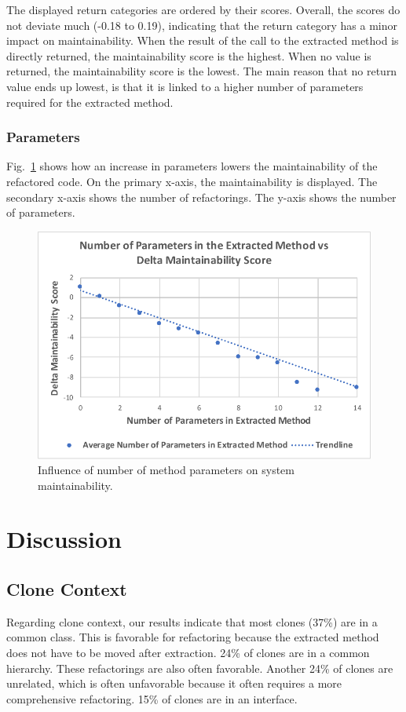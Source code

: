 \documentclass[sigconf,review, table]{acmart}
\begin{document}
The displayed return categories are ordered by their scores. Overall, the scores do not deviate much (-0.18 to 0.19), indicating that the return category has a minor impact on maintainability. When the result of the call to the extracted method is directly returned, the maintainability score is the highest. When no value is returned, the maintainability score is the lowest. The main reason that no return value ends up lowest, is that it is linked to a higher number of parameters required for the extracted method.

\subsubsection{Parameters}
Fig.~\ref{fig:arguments} shows how an increase in parameters lowers the maintainability of the refactored code. On the primary x-axis, the maintainability is displayed. The secondary x-axis shows the number of refactorings. The y-axis shows the number of parameters.

\begin{figure}[H]
  \includegraphics[width=1\columnwidth]{img/arguments}
  \caption{Influence of number of method parameters on system maintainability.}
  \label{fig:arguments}
\end{figure}

\section{Discussion}

\subsection{Clone Context}
Regarding clone context, our results indicate that most clones (37\%) are in a common class. This is favorable for refactoring because the extracted method does not have to be moved after extraction. 24\% of clones are in a common hierarchy. These refactorings are also often favorable. Another 24\% of clones are unrelated, which is often unfavorable because it often requires a more comprehensive refactoring. 15\% of clones are in an interface.
\end{document}
